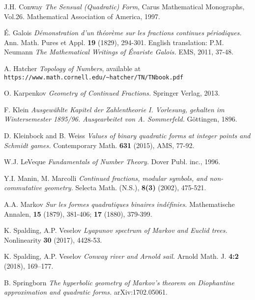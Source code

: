 \documentclass[11pt,reqno]{amsart}
\begin{document}
\begin{thebibliography}{12}
	
 J.H. Conway {\it The Sensual (Quadratic) Form}, Carus Mathematical Monographs, Vol.26.
Mathematical Association of America, 1997.

\'E. Galois {\it D\'emonstration d'un th\'eor\`eme sur les fractions continues p\'eriodiques.}  Ann. Math. Pures et Appl. {\bf 19} (1829), 294-301. English translation: P.M. Neumann {\it The Mathematical Writings of \'Evariste Galois.} EMS, 2011, 37-48.

A. Hatcher {\it Topology of Numbers}, available at \\ {\tt https://www.math.cornell.edu/\~{}hatcher/TN/TNbook.pdf}

O. Karpenkov {\it Geometry of Continued Fractions.} Springer Verlag, 2013.



F. Klein {\it Ausgew\"ahlte Kapitel der Zahlentheorie I. Vorlesung, gehalten im Wintersemester
1895/96. Ausgearbeitet von A. Sommerfeld.} G\"ottingen, 1896.

D. Kleinbock and B. Weiss {\it Values of binary quadratic forms at integer points and Schmidt games.} %
Contemporary Math. {\bf 631} (2015), AMS, 77-92.
 
W.J. LeVeque {\it Fundamentals of Number Theory.} Dover Publ. inc., 1996.

Y.I. Manin, M. Marcolli {\it Continued fractions, modular symbols, and non-commutative geometry.} Selecta Math. (N.S.), {\bf 8(3)} (2002), 475-521.

 A.A. Markov {\it Sur les formes quadratiques binaires ind\'efinies}.
	Mathematische Annalen, {\bf 15} (1879), 381-406; {\bf 17} (1880), 379-399.
	
K. Spalding, A.P. Veselov {\it Lyapunov spectrum of Markov and Euclid trees.} Nonlinearity {\bf 30} (2017), 4428-53.

 K. Spalding, A.P. Veselov {\it Conway river and Arnold sail.} Arnold Math. J. {\bf 4:2} (2018), 169--177.


B. Springborn {\it The hyperbolic geometry of Markov's theorem on
Diophantine approximation and quadratic forms.} arXiv:1702.05061.
	


\end{thebibliography}
\end{document}
